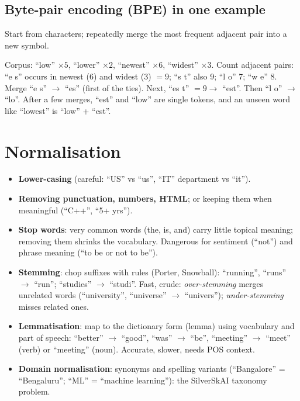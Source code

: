 \subsection{Byte-pair encoding (BPE) in one example}
Start from characters; repeatedly merge the most frequent adjacent pair into a new symbol.
\begin{example}
Corpus: ``low'' $\times5$, ``lower'' $\times2$, ``newest'' $\times6$, ``widest'' $\times3$. Count adjacent pairs: ``e s'' occurs in newest (6)
and widest (3) $= 9$; ``s t'' also 9; ``l o'' 7; ``w e'' 8. Merge ``e s'' $\to$ ``es'' (first of the ties). Next, ``es t'' $= 9\to$ ``est''. Then
``l o'' $\to$ ``lo''. After a few merges, ``est'' and ``low'' are single tokens, and an unseen word like ``lowest'' is ``low'' + ``est''.
\end{example}

\section{Normalisation}
\begin{itemize}
\item \textbf{Lower-casing} (careful: ``US'' vs ``us'', ``IT'' department vs ``it'').
\item \textbf{Removing punctuation, numbers, HTML}; or keeping them when meaningful (``C++'', ``5+ yrs'').
\item \textbf{Stop words}: very common words (the, is, and) carry little topical meaning; removing them shrinks the vocabulary.
  Dangerous for sentiment (``not'') and phrase meaning (``to be or not to be'').
\item \textbf{Stemming}: chop suffixes with rules (Porter, Snowball): ``running'', ``runs'' $\to$ ``run''; ``studies'' $\to$ ``studi''. Fast, crude:
  \emph{over-stemming} merges unrelated words (``university'', ``universe'' $\to$ ``univers''); \emph{under-stemming} misses related ones.
\item \textbf{Lemmatisation}: map to the dictionary form (lemma) using vocabulary and part of speech: ``better'' $\to$ ``good'', ``was'' $\to$ ``be'',
  ``meeting'' $\to$ ``meet'' (verb) or ``meeting'' (noun). Accurate, slower, needs POS context.
\item \textbf{Domain normalisation}: synonyms and spelling variants (``Bangalore'' = ``Bengaluru''; ``ML'' = ``machine learning''): the
  SilverSkAI taxonomy problem.
\end{itemize}

